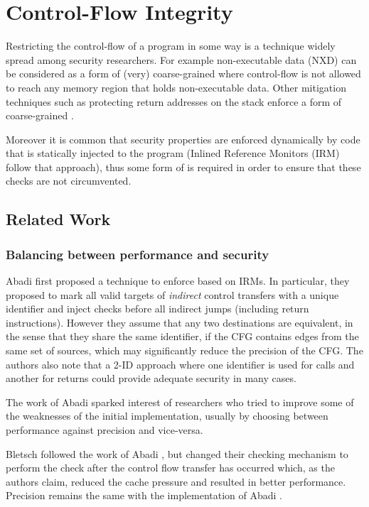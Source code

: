 \chapter{Control-Flow Integrity}\label{ch:cfi}

Restricting the control-flow of a program in some way is a technique widely
spread among security researchers. For example non-executable data (NXD)
can be considered as a form of (very) coarse-grained \CFI where control-flow is
not allowed to reach any memory region that holds non-executable data. Other
mitigation techniques such as protecting return addresses on the stack enforce
a form of coarse-grained \CFI.

Moreover it is common that security properties are enforced dynamically by code
that is statically injected to the program (\EG Inlined Reference Monitors (IRM)
\cite{Erlingsson04} follow that approach), thus some form of \CFI is required in
order to ensure that these checks are not circumvented. 

\section{Related Work}

\subsection{Balancing between performance and security}\label{sec:security_cfi}

Abadi \ETAL first proposed a technique to enforce \CFI based on IRMs. 
In particular, they proposed to mark all valid targets of \emph{indirect} 
control transfers with a unique identifier and inject checks before all 
indirect jumps (including return instructions). However they assume that any 
two destinations are equivalent, in the sense that they share the same 
identifier, if the CFG contains edges from the same  set of sources, which may
significantly reduce the precision of the CFG. 
The authors also note that a 2-ID approach where one identifier is used for 
calls and another for returns could provide adequate security in many cases. 

The work of Abadi \ETAL sparked interest of researchers who tried to improve
some of the weaknesses of the initial implementation, usually by choosing 
between performance against precision and vice-versa.

Bletsch \ETAL \cite{Bletsch:2011:MCA:2076732.2076783} followed the work
of Abadi \ETAL, but changed their checking mechanism to perform the check
after the control flow transfer has occurred which, as the authors claim,
reduced the cache pressure and resulted in better performance. Precision remains
the same with the implementation of Abadi \ETAL.

